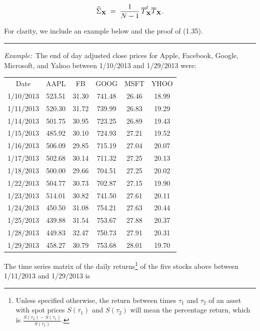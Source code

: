 \begin{equation}
\widehat{\Sigma}_{\mathbf{X}} \;=\; \frac{1}{N-1}\,\overline{T}_{\mathbf{X}}^t\overline{T}_{\mathbf{X}}.
\end{equation}

For clarity, we include an example below and the proof of (1.35).

\medskip
\noindent\rule{\linewidth}{0.4pt}
\medskip

\noindent\textit{Example:}\ The end of day adjusted close prices for Apple,
Facebook, Google, Microsoft, and Yahoo between 1/10/2013 and 1/29/2013 were:

\begin{center}
\begin{tabular}{cccccc}
Date & AAPL & FB & GOOG & MSFT & YHOO \\[2pt]
1/10/2013 & 523.51 & 31.30 & 741.48 & 26.46 & 18.99 \\
1/11/2013 & 520.30 & 31.72 & 739.99 & 26.83 & 19.29 \\
1/14/2013 & 501.75 & 30.95 & 723.25 & 26.89 & 19.43 \\
1/15/2013 & 485.92 & 30.10 & 724.93 & 27.21 & 19.52 \\
1/16/2013 & 506.09 & 29.85 & 715.19 & 27.04 & 20.07 \\
1/17/2013 & 502.68 & 30.14 & 711.32 & 27.25 & 20.13 \\
1/18/2013 & 500.00 & 29.66 & 704.51 & 27.25 & 20.02 \\
1/22/2013 & 504.77 & 30.73 & 702.87 & 27.15 & 19.90 \\
1/23/2013 & 514.01 & 30.82 & 741.50 & 27.61 & 20.11 \\
1/24/2013 & 450.50 & 31.08 & 754.21 & 27.63 & 20.44 \\
1/25/2013 & 439.88 & 31.54 & 753.67 & 27.88 & 20.37 \\
1/28/2013 & 449.83 & 32.47 & 750.73 & 27.91 & 20.31 \\
1/29/2013 & 458.27 & 30.79 & 753.68 & 28.01 & 19.70 \\
\end{tabular}
\end{center}

The time series matrix of the daily returns\footnote{Unless specified
otherwise, the return between times $\tau_1$ and $\tau_2$ of an asset with
spot prices $S(\tau_1)$ and $S(\tau_2)$ will mean the percentage return,
which is $\frac{S(\tau_2)-S(\tau_1)}{S(\tau_1)}$.} of the five stocks above
between 1/11/2013 and 1/29/2013 is

